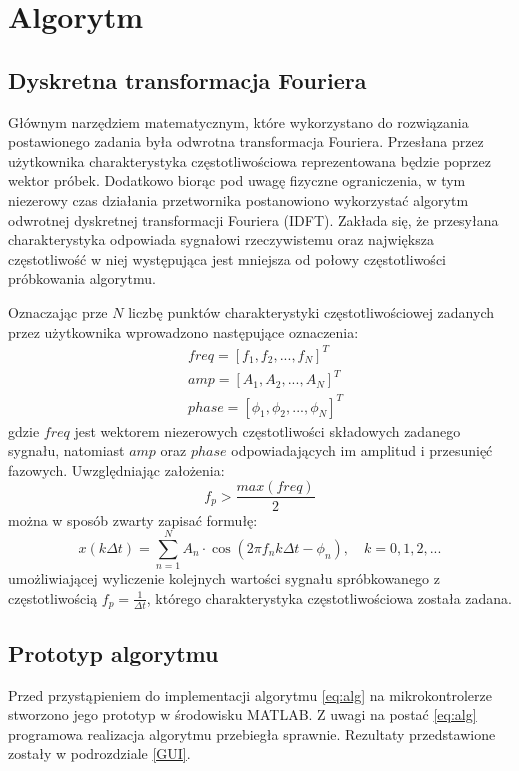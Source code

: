 \section{Algorytm}
\label{algorytm}
\subsection{Dyskretna transformacja Fouriera}
Głównym narzędziem matematycznym, które wykorzystano do rozwiązania postawionego zadania była odwrotna transformacja Fouriera. Przesłana przez użytkownika charakterystyka częstotliwościowa reprezentowana będzie poprzez wektor próbek. Dodatkowo biorąc pod uwagę fizyczne ograniczenia, w tym niezerowy czas działania przetwornika postanowiono wykorzystać algorytm odwrotnej dyskretnej transformacji Fouriera (IDFT). Zakłada się, że przesyłana charakterystyka odpowiada sygnałowi rzeczywistemu oraz największa częstotliwość w niej występująca jest mniejsza od połowy częstotliwości próbkowania algorytmu. 

Oznaczając prze $N$ liczbę punktów charakterystyki częstotliwościowej zadanych przez użytkownika wprowadzono następujące oznaczenia:
\begin{align*} 
&freq = [f_1, f_2, ..., f_N]^T \\ 
&amp = [A_1, A_2, ..., A_N]^T \\
&phase = [\phi_1, \phi_2, ..., \phi_N]^T
\end{align*}
gdzie $freq$ jest wektorem niezerowych częstotliwości składowych zadanego sygnału, natomiast $amp$ oraz $phase$ odpowiadających im amplitud i przesunięć fazowych. Uwzględniając założenia:
\begin{equation}
\label{eq:twP}
f_p > \frac{max(freq)}{2}
\end{equation}
można w sposób zwarty zapisać formułę:
\begin{equation}
\label{eq:alg}
x(k\Delta t) = \sum_{n=1}^{N}A_n\cdot\cos(2 \pi f_nk \Delta t - \phi_n), \quad k=0,1,2,...
\end{equation}
umożliwiającej wyliczenie kolejnych wartości sygnału spróbkowanego z częstotliwością $f_p=\frac{1}{\Delta t}$, którego charakterystyka częstotliwościowa została zadana.

\subsection{Prototyp algorytmu}
Przed przystąpieniem do implementacji algorytmu \ref{eq:alg} na mikrokontrolerze stworzono jego prototyp w środowisku MATLAB. Z uwagi na postać \ref{eq:alg} programowa realizacja algorytmu przebiegła sprawnie. Rezultaty przedstawione zostały w podrozdziale \ref{GUI}.

